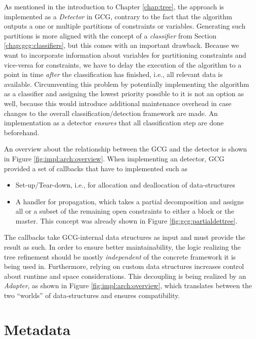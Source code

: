 		As mentioned in the introduction to Chapter \ref{chap:tree}, the approach is implemented as a \textit{Detector} in \ac{GCG}, contrary to the fact that the algorithm outputs a one or multiple partitions of constraints or variables.
		Generating such partitions is more aligned with the concept of a \textit{classifier} from Section \ref{chap:gcg:classifiers}, but this comes with an important drawback.
		Because we want to incorporate information about variables for partitioning constraints and vice-versa for constraints, we have to delay the execution of the algorithm to a point in time \textit{after} the classification has finished, i.e., all relevant data is available.
		Circumventing this problem by potentially implementing the algorithm as a classifier and assigning the lowest priority possible to it is not an option as well, because this would introduce additional maintenance overhead in case changes to the overall classification/detection framework are made.
		An implementation as a detector \textit{ensures} that all classification step are done beforehand.

		An overview about the relationship between the \ac{GCG} and the detector is shown in Figure \ref{fig:impl:arch:overview}.
		When implementing an detector, \ac{GCG} provided a set of callbacks that have to implemented such as
		\begin{itemize}
			\item Set-up/Tear-down, i.e., for allocation and deallocation of data-structures
			\item A handler for propagation, which takes a partial decomposition and assigns all or a subset of the remaining open constraints to either a block or the master. This concept was already shown in Figure \ref{fig:gcg:partialdettree}.
		\end{itemize}

		\clearpage

		The callbacks take \ac{GCG}-internal data structures as input and must provide the result as such.
		In order to ensure better maintainability, the logic realizing the tree refinement should be mostly \textit{independent} of the concrete framework it is being used in.
		Furthermore, relying on custom data structures increases control about runtime and space considerations. 
		This decoupling is being realized by an \textit{Adapter}, as shown in Figure \ref{fig:impl:arch:overview}, which translates between the two \enquote{worlds} of data-structures and ensures compatibility.

	\section{Metadata}
	\label{chap:impl:meta}

